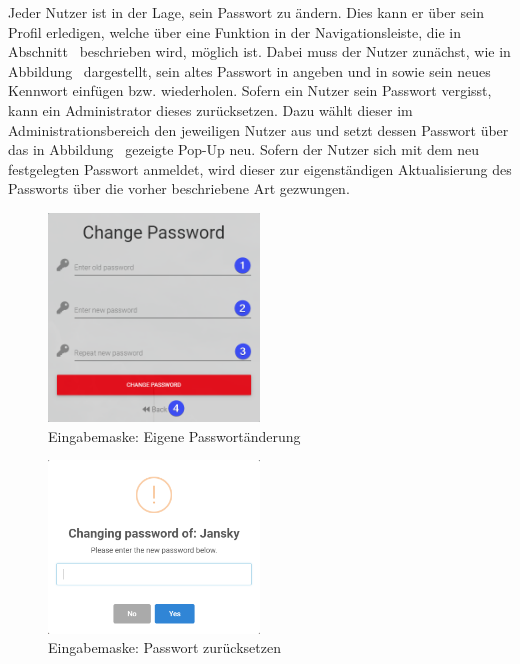 Jeder Nutzer ist in der Lage, sein Passwort zu ändern.
Dies kann er über sein Profil erledigen, welche über eine Funktion in der Navigationsleiste, die in Abschnitt~ beschrieben wird, möglich ist.
Dabei muss der Nutzer zunächst, wie in Abbildung~ dargestellt, sein altes Passwort in \desOne angeben und in \desTwo sowie \desThree sein neues Kennwort einfügen bzw. wiederholen.
Sofern ein Nutzer sein Passwort vergisst, kann ein Administrator dieses zurücksetzen.
Dazu wählt dieser im Administrationsbereich  den jeweiligen Nutzer aus und setzt dessen Passwort über das in Abbildung~ gezeigte Pop-Up neu.
Sofern der Nutzer sich mit dem neu festgelegten Passwort anmeldet, wird dieser zur eigenständigen Aktualisierung des Passworts über die vorher beschriebene Art gezwungen.

\begin{figure}[H]
	\centering
	\includegraphics[width=0.5\textwidth, keepaspectratio]{img/guide/ChangeOwnPassword.png}
	\captionsetup{justification=centering, format=plain}
	\caption[Eingabemaske: Eigene Passwortänderung]{Eingabemaske: Eigene Passwortänderung \\\quelleScreenshot}
	\label{fig:ChangeOwnPassword}
\end{figure}

\begin{figure}[H]
	\centering
	\includegraphics[width=0.5\textwidth, keepaspectratio]{img/guide/ChangePassword.png}
	\captionsetup{justification=centering, format=plain}
	\caption[Eingabemaske: Passwort zurücksetzen]{Eingabemaske: Passwort zurücksetzen \\\quelleScreenshot}
	\label{fig:ChangePasswordOfUser}
\end{figure}

